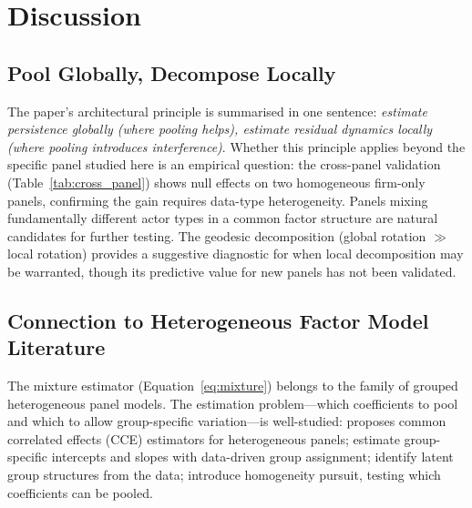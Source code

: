 \documentclass[11pt,a4paper]{article}
\begin{document}
\section{Discussion}
\label{sec:discussion}

\subsection{Pool Globally, Decompose Locally}

The paper's architectural principle is summarised in one sentence: \emph{estimate persistence globally (where pooling helps), estimate residual dynamics locally (where pooling introduces interference)}. Whether this principle applies beyond the specific panel studied here is an empirical question: the cross-panel validation (Table~\ref{tab:cross_panel}) shows null effects on two homogeneous firm-only panels, confirming the gain requires data-type heterogeneity. Panels mixing fundamentally different actor types in a common factor structure are natural candidates for further testing. The geodesic decomposition (global rotation $\gg$ local rotation) provides a suggestive diagnostic for when local decomposition may be warranted, though its predictive value for new panels has not been validated.

\subsection{Connection to Heterogeneous Factor Model Literature}

The mixture estimator (Equation~\ref{eq:mixture}) belongs to the family of grouped heterogeneous panel models. The estimation problem---which coefficients to pool and which to allow group-specific variation---is well-studied: \citet{pesaran2006estimation} proposes common correlated effects (CCE) estimators for heterogeneous panels; \citet{bonhomme2015grouped} estimate group-specific intercepts and slopes with data-driven group assignment; \citet{su2016identifying} identify latent group structures from the data; \citet{ke2015homogeneity} introduce homogeneity pursuit, testing which coefficients can be pooled.
\end{document}
